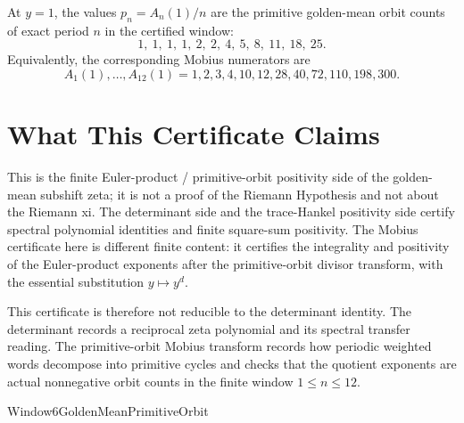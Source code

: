 At $y=1$, the values $p_n=A_n(1)/n$ are the primitive golden-mean orbit counts of exact period $n$ in the certified window:
$$
1,\ 1,\ 1,\ 1,\ 2,\ 2,\ 4,\ 5,\ 8,\ 11,\ 18,\ 25.
$$
Equivalently, the corresponding Mobius numerators are
$$
A_1(1),\ldots,A_{12}(1)=1,2,3,4,10,12,28,40,72,110,198,300.
$$

\section{What This Certificate Claims}
\label{sec:window6-primitive-orbit-scope}

This is the finite Euler-product / primitive-orbit positivity side of the golden-mean subshift zeta; it is not a proof of the Riemann Hypothesis and not about the Riemann xi. The determinant side and the trace-Hankel positivity side certify spectral polynomial identities and finite square-sum positivity. The Mobius certificate here is different finite content: it certifies the integrality and positivity of the Euler-product exponents after the primitive-orbit divisor transform, with the essential substitution $y\mapsto y^d$.

This certificate is therefore not reducible to the determinant identity. The determinant records a reciprocal zeta polynomial and its spectral transfer reading. The primitive-orbit Mobius transform records how periodic weighted words decompose into primitive cycles and checks that the quotient exponents are actual nonnegative orbit counts in the finite window $1\le n\le12$.



\begin{closurestatus}{Window6GoldenMeanPrimitiveOrbit}
  \theoryclosure{\scopedClosure}
  \formalstatus{\theoremCheckedV}
\end{closurestatus}

